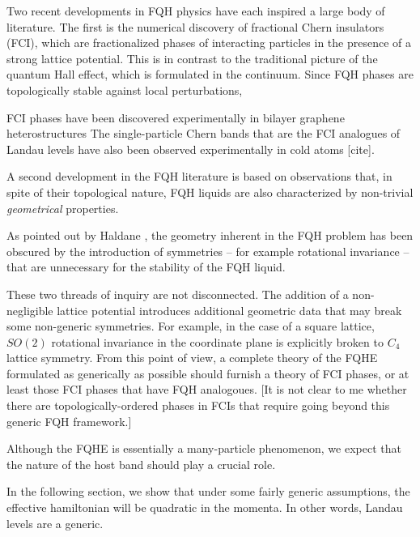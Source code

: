 \documentclass[aps,prb,twocolumn,letterpaper,twoside,nobalancelastpage,groupedaddress,amsmath,amssymb,floatfix,citeautoscript]{revtex4-1}
\begin{document}
Two recent developments in FQH physics have each inspired a large body of literature. The first is the numerical discovery of fractional Chern insulators (FCI), which are fractionalized phases of interacting particles in the presence of a strong lattice potential. This is in contrast to the traditional picture of the quantum Hall effect, which is formulated in the continuum. Since FQH phases are topologically stable against local perturbations,

FCI phases have been discovered experimentally in bilayer graphene heterostructures \cite{Spantoneaan8458} The single-particle Chern bands that are the FCI analogues of Landau levels have also been observed experimentally in cold atoms [cite].

A second development in the FQH literature is based on observations that, in spite of their topological nature, FQH liquids are also characterized by non-trivial \textit{geometrical} properties.

As pointed out by Haldane \cite{Haldane2011}, the geometry inherent in the FQH problem has been obscured by the introduction of symmetries -- for example rotational invariance -- that are unnecessary for the stability of the FQH liquid. 

These two threads of inquiry are not disconnected. The addition of a non-negligible lattice potential introduces additional geometric data that may break some non-generic symmetries. For example, in the case of a square lattice, $SO(2)$ rotational invariance in the coordinate plane is explicitly broken to $C_4$ lattice symmetry. From this point of view, a complete theory of the FQHE formulated as generically as possible should furnish a theory of FCI phases, or at least those FCI phases that have FQH analogoues. [It is not clear to me whether there are topologically-ordered phases in FCIs that require going beyond this generic FQH framework.]


Although the FQHE is essentially a many-particle phenomenon, we expect that the nature of the host band should play a crucial role. 


In the following section, we show that under some fairly generic assumptions, the effective hamiltonian will be quadratic in the momenta. In other words, Landau levels are a generic.
\end{document}
